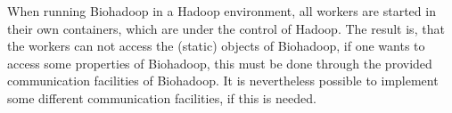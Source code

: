  When running Biohadoop in a Hadoop environment, all workers are started in their own containers, which are under the control of Hadoop. The result is, that the workers can not access the (static) objects of Biohadoop, if one wants to access some properties of Biohadoop, this must be done through the provided communication facilities of Biohadoop. It is nevertheless possible to implement some different communication facilities, if this is needed.

% 

% 
% 
% 


